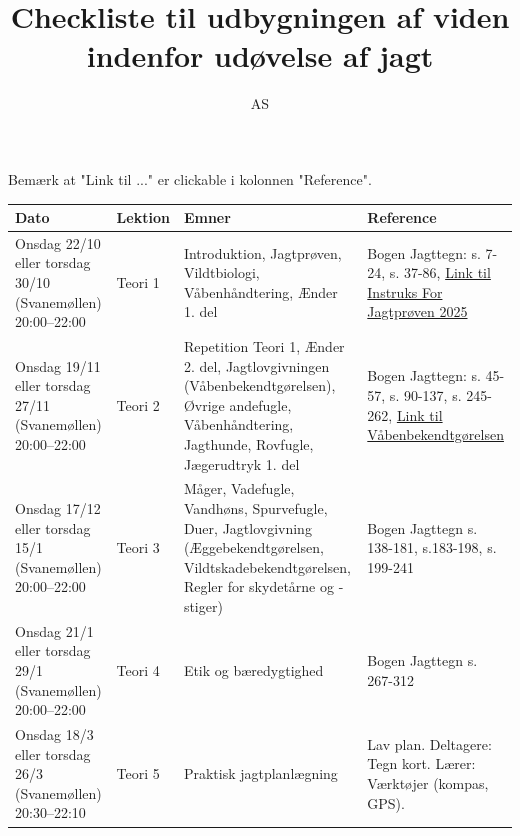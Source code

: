 \documentclass[10pt,a4paper]{article}
\title{Checkliste til udbygningen af viden indenfor udøvelse af jagt}
\author{AS}
\begin{document}
\maketitle
\thispagestyle{fancy} %

\vspace{0.5cm}

Bemærk at "Link til ..." er clickable i kolonnen "Reference".

\begin{center}
\begin{tabular}{|>{\raggedright\arraybackslash}p{4.5cm}|>{\raggedright\arraybackslash}p{1.5cm}|>{\raggedright\arraybackslash}p{5cm}|>{\raggedright\arraybackslash}p{5.5cm}|}
\hline
\textbf{Dato} & \textbf{Lektion} & \textbf{Emner} & \textbf{Reference} \\
\hline

Onsdag 22/10 eller torsdag 30/10 (Svanemøllen) 20:00–22:00 & Teori 1 & Introduktion, Jagtprøven, Vildtbiologi, Våbenhåndtering, Ænder 1. del & Bogen Jagttegn: s. 7-24, s. 37-86, \href{https://sgavmst.dk/media/2w5hrceb/2025_instruks-for-jagtproeven.pdf}{Link til Instruks For Jagtprøven 2025}\\
\hline

Onsdag 19/11 eller torsdag 27/11 (Svanemøllen) 20:00–22:00 & Teori 2 & Repetition Teori 1, Ænder 2. del, Jagtlovgivningen (Våbenbekendtgørelsen), Øvrige andefugle, Våbenhåndtering, Jagthunde, Rovfugle, Jægerudtryk 1. del & Bogen Jagttegn: s. 45-57, s. 90-137, s. 245-262, \href{https://www.retsinformation.dk/eli/lta/2021/2531}{Link til Våbenbekendtgørelsen} \\
\hline

Onsdag 17/12 eller torsdag 15/1 (Svanemøllen) 20:00–22:00 & Teori 3 & Måger, Vadefugle, Vandhøns, Spurvefugle, Duer, Jagtlovgivning (Æggebekendtgørelsen, Vildtskadebekendtgørelsen, Regler for skydetårne og -stiger) & Bogen Jagttegn s. 138-181, s.183-198, s. 199-241 \\
\hline

Onsdag 21/1 eller torsdag 29/1 (Svanemøllen) 20:00–22:00 & Teori 4 & Etik og bæredygtighed & Bogen Jagttegn s. 267-312 \\
\hline

Onsdag 18/3 eller torsdag 26/3 (Svanemøllen) 20:30–22:10 & Teori 5 & Praktisk jagtplanlægning & Lav plan. Deltagere: Tegn kort. Lærer: Værktøjer (kompas, GPS). \\
\hline

\end{tabular}
\end{center}
\end{document}
